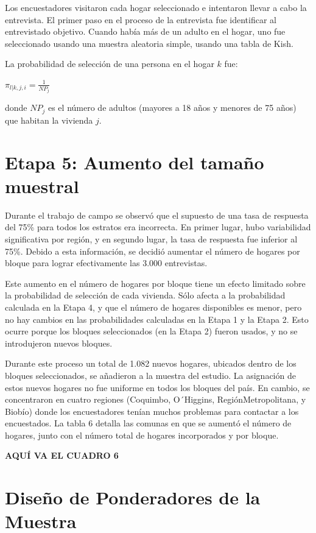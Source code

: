 \documentclass[
]{book}
\begin{document}
Los encuestadores visitaron cada hogar seleccionado e intentaron llevar
a cabo la entrevista. El primer paso en el proceso de la entrevista fue
identificar al entrevistado objetivo. Cuando había más de un adulto en
el hogar, uno fue seleccionado usando una muestra aleatoria simple,
usando una tabla de Kish.

La probabilidad de selección de una persona en el hogar \(k\) fue:

\(\pi_{l|k,j,i}=\frac{1}{NP_j}\)

donde \(NP_j\) es el número de adultos (mayores a 18 años y menores de
75 años) que habitan la vivienda \(j\).

\hypertarget{etapa-5-aumento-del-tamauxf1o-muestral}{%
\section{Etapa 5: Aumento del tamaño
muestral}\label{etapa-5-aumento-del-tamauxf1o-muestral}}

Durante el trabajo de campo se observó que el supuesto de una tasa de
respuesta del 75\% para todos los estratos era incorrecta. En primer
lugar, hubo variabilidad significativa por región, y en segundo lugar,
la tasa de respuesta fue inferior al 75\%. Debido a esta información, se
decidió aumentar el número de hogares por bloque para lograr
efectivamente las 3.000 entrevistas.

Este aumento en el número de hogares por bloque tiene un efecto limitado
sobre la probabilidad de selección de cada vivienda. Sólo afecta a la
probabilidad calculada en la Etapa 4, y que el número de hogares
disponibles es menor, pero no hay cambios en las probabilidades
calculadas en la Etapa 1 y la Etapa 2. Esto ocurre porque los bloques
seleccionados (en la Etapa 2) fueron usados, y no se introdujeron nuevos
bloques.

Durante este proceso un total de 1.082 nuevos hogares, ubicados dentro
de los bloques seleccionados, se añadieron a la muestra del estudio. La
asignación de estos nuevos hogares no fue uniforme en todos los bloques
del país. En cambio, se concentraron en cuatro regiones (Coquimbo,
O´Higgins, RegiónMetropolitana, y Biobío) donde los encuestadores tenían
muchos problemas para contactar a los encuestados. La tabla 6 detalla
las comunas en que se aumentó el número de hogares, junto con el número
total de hogares incorporados y por bloque.

\textbf{AQUÍ VA EL CUADRO 6}

\hypertarget{diseuxf1o-de-ponderadores-de-la-muestra}{%
\section{Diseño de Ponderadores de la
Muestra}\label{diseuxf1o-de-ponderadores-de-la-muestra}}
\end{document}
